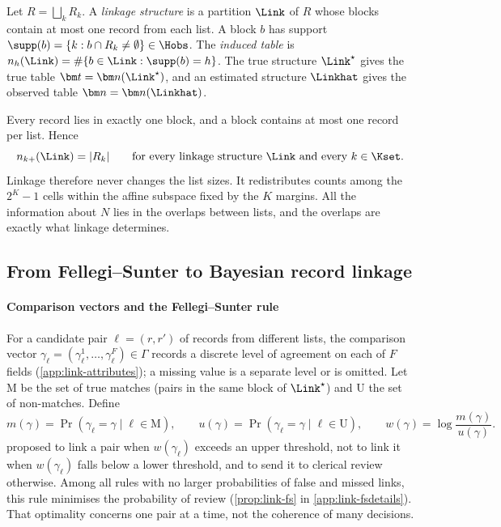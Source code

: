 \begin{definition}\label{def:link-structure}
Let $R=\bigsqcup_{k}R_k$. A \emph{linkage structure} is a partition $\Link$ of $R$ whose blocks contain at most one record from each list. A block $b$ has support $\supp(b)=\{k:b\cap R_k\neq\emptyset\}\in\Hobs$. The \emph{induced table} is $n_h(\Link)=\#\{b\in\Link:\supp(b)=h\}$. The true structure $\Link^\star$ gives the true table $\bm t=\bm n(\Link^\star)$, and an estimated structure $\Linkhat$ gives the observed table $\bm n=\bm n(\Linkhat)$.
\end{definition}

Every record lies in exactly one block, and a block contains at most one record per list. Hence
\begin{equation}\label{eq:link-margins}
  n_{k+}(\Link)=|R_k|\qquad\text{for every linkage structure }\Link\text{ and every }k\in\Kset .
\end{equation}
Linkage therefore never changes the list sizes. It redistributes counts among the $2^K-1$ cells within the affine subspace fixed by the $K$ margins. All the information about $N$ lies in the overlaps between lists, and the overlaps are exactly what linkage determines.

\subsection{From Fellegi--Sunter to Bayesian record linkage}\label{sec:link-fs}

\paragraph{Comparison vectors and the Fellegi--Sunter rule}
For a candidate pair $\ell=(r,r')$ of records from different lists, the comparison vector $\gamma_\ell=(\gamma_\ell^1,\dots,\gamma_\ell^F)\in\Gamma$ records a discrete level of agreement on each of $F$ fields (\cref{app:link-attributes}); a missing value is a separate level or is omitted. Let $\mathrm M$ be the set of true matches (pairs in the same block of $\Link^\star$) and $\mathrm U$ the set of non-matches. Define
\[
  m(\gamma)=\Pr(\gamma_\ell=\gamma\mid\ell\in\mathrm M),\qquad
  u(\gamma)=\Pr(\gamma_\ell=\gamma\mid\ell\in\mathrm U),\qquad
  w(\gamma)=\log\frac{m(\gamma)}{u(\gamma)} .
\]
 proposed to link a pair when $w(\gamma_\ell)$ exceeds an upper threshold, not to link it when $w(\gamma_\ell)$ falls below a lower threshold, and to send it to clerical review otherwise. Among all rules with no larger probabilities of false and missed links, this rule minimises the probability of review (\cref{prop:link-fs} in \cref{app:link-fsdetails}). That optimality concerns one pair at a time, not the coherence of many decisions.

